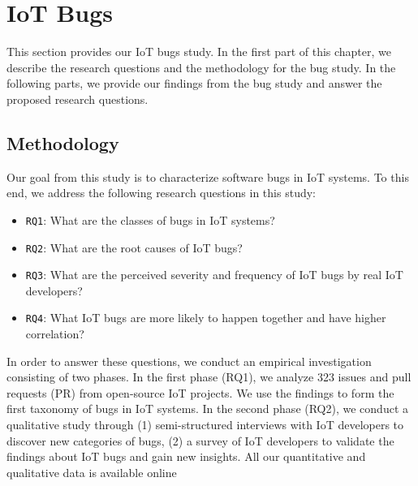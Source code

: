 
\chapter{IoT Bugs}
\label{ch:bugs}
This section provides our IoT bugs study. In the first part of this chapter, we describe the research questions and the methodology for the bug study. In the following parts, we provide our findings from the bug study and answer the proposed research questions.

\section{Methodology}
Our goal from this study is to characterize software bugs in IoT systems. To this end, we address the following research questions in this study:
\begin{itemize}
\item {\verb|RQ1|}: What are the classes of bugs in IoT systems?
\item {\verb|RQ2|}: What are the root causes of IoT bugs?
\item {\verb|RQ3|}: What are the perceived severity and frequency of IoT bugs by real IoT developers?
\item {\verb|RQ4|}: What IoT bugs are more likely to happen together and have higher correlation?
\end{itemize}
In order to answer these questions, we conduct an empirical investigation consisting of two phases. In the first phase (RQ1), we analyze 323 issues and pull requests (PR) from open-source IoT projects. We use the findings to form the first taxonomy of bugs in IoT systems. In the second phase (RQ2), we conduct a qualitative study through (1) semi-structured interviews with IoT developers to discover new categories of bugs, (2) a survey of IoT developers to validate the findings about IoT bugs and gain new insights. All our quantitative and qualitative data is available online~\cite{repPack} 


